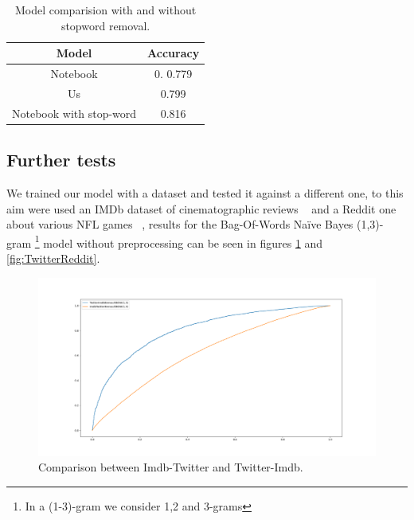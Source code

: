 \begin{table}[h!t]
    \centering
    \caption{Model comparision with and without stopword removal.}
    \label{tab:versus_metrics_FT}
    \begin{tabular}{c|c}
        \hline
        Model & Accuracy\\
        \hline 
        Notebook & 0. 0.779 \\ 
        Us & 0.799 \\ 
        Notebook with stop-word & 0.816 \\ 
        \hline
    \end{tabular}
\end{table}

\subsection*{Further tests}
We trained our model with a dataset and tested it against a different one, to this aim were used an IMDb dataset of cinematographic reviews ~\cite{data:imdb} and a Reddit one about various NFL games ~\cite{data:reddit}, results for the Bag-Of-Words Na\"ive Bayes (1,3)-gram \footnote{In a (1-3)-gram we consider 1,2 and 3-grams} model without preprocessing can be seen in figures \ref{fig:TwitterImdb} and \ref{fig:TwitterReddit}.

\begin{figure}[h!t]
    \centering
    \includegraphics[scale=0.25]{../experiments/plots/ImdbTwitter}
    \caption{Comparison between Imdb-Twitter and Twitter-Imdb.}
    \label{fig:TwitterImdb}        
\end{figure}

